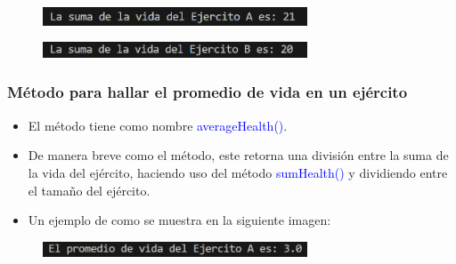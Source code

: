 \documentclass{article}
\begin{document}
        \begin{figure}[H]
            \centering
            \includegraphics[width=0.7\textwidth,keepaspectratio]{img/sumHealth.png}
            \caption{}
        \end{figure}

        \begin{figure}[H]
            \centering
            \includegraphics[width=0.7\textwidth,keepaspectratio]{img/sumHealth2.png}
            \caption{}
        \end{figure}
        
        
        \subsubsection{Método para hallar el promedio de vida en un ejército}

        \begin{itemize}
            \item El método tiene como nombre \textcolor{blue}{averageHealth()}.
            \item De manera breve como el método, este retorna una división entre la suma de la vida del ejército, haciendo uso del método \textcolor{blue}{sumHealth()} y dividiendo entre el tamaño del ejército.
        \end{itemize}

        

        \begin{itemize}
            \begin{itemize}
                \item Un ejemplo de como se muestra en la siguiente imagen:
            \end{itemize}
        \end{itemize}

        \begin{figure}[H]
            \centering
            \includegraphics[width=0.7\textwidth,keepaspectratio]{img/averageHealth.png}
            \caption{}
        \end{figure}
\end{document}
